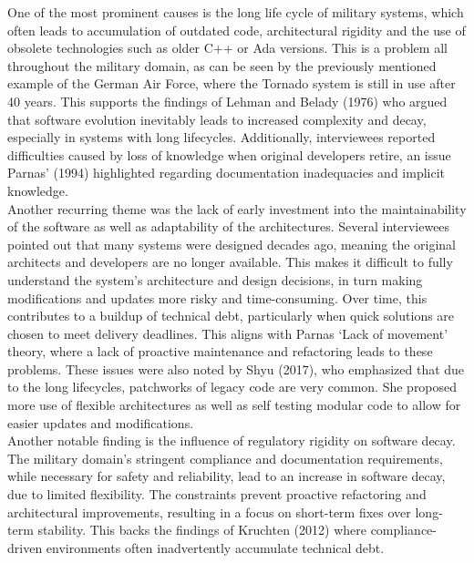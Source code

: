 One of the most prominent causes is the long life cycle of military systems, which often leads to accumulation of outdated code, architectural rigidity and the use of obsolete technologies such as older C++ or Ada versions.
This is a problem all throughout the military domain, as can be seen by the previously mentioned example of the German Air Force, where the Tornado system is still in use after 40 years.
This supports the findings of Lehman and Belady (1976) who argued that software evolution inevitably leads to increased complexity and decay, especially in systems with long lifecycles.
Additionally, interviewees reported difficulties caused by loss of knowledge when original developers retire, an issue Parnas' (1994) highlighted regarding documentation inadequacies and implicit knowledge.\\

Another recurring theme was the lack of early investment into the maintainability of the software as well as adaptability of the architectures. Several interviewees pointed out that many systems were designed decades ago, meaning the original architects and developers are no longer available.
This makes it difficult to fully understand the system's architecture and design decisions, in turn making modifications and updates more risky and time-consuming. 
Over time, this contributes to a buildup of technical debt, particularly when quick solutions are chosen to meet delivery deadlines.
This aligns with Parnas `Lack of movement' theory, where a lack of proactive maintenance and refactoring leads to these problems.
These issues were also noted by Shyu (2017), who emphasized that due to the long lifecycles, patchworks of legacy code are very common. She proposed more use of flexible architectures as well as self testing modular code to allow for easier updates and modifications.\\

Another notable finding is the influence of regulatory rigidity on software decay. The military domain's stringent compliance and documentation requirements, while necessary for safety and reliability, lead to an increase in software decay, due to limited flexibility.
The constraints prevent proactive refactoring and architectural improvements, resulting in a focus on short-term fixes over long-term stability. This backs the findings of Kruchten (2012) where compliance-driven environments often inadvertently accumulate technical debt.

